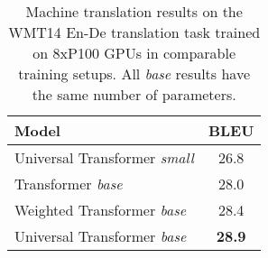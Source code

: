 \begin{table}
    \centering
    \begin{tabular}{lc}
        \toprule
        \bf{Model} & \bf{BLEU} \\
        \midrule
        Universal Transformer \emph{small} & 26.8 \\
        Transformer \emph{base}~\citep{transformer} & 28.0 \\
        Weighted Transformer \emph{base}~\citep{ahmed2017weighted} & 28.4 \\
        Universal Transformer \emph{base} & \bf{28.9} \\
        \bottomrule
    \end{tabular}
    \caption{Machine translation results on the WMT14 En-De translation task trained on 8xP100 GPUs in comparable training setups. All \emph{base} results have the same number of parameters.}
    \label{tab:wmt}
\end{table}